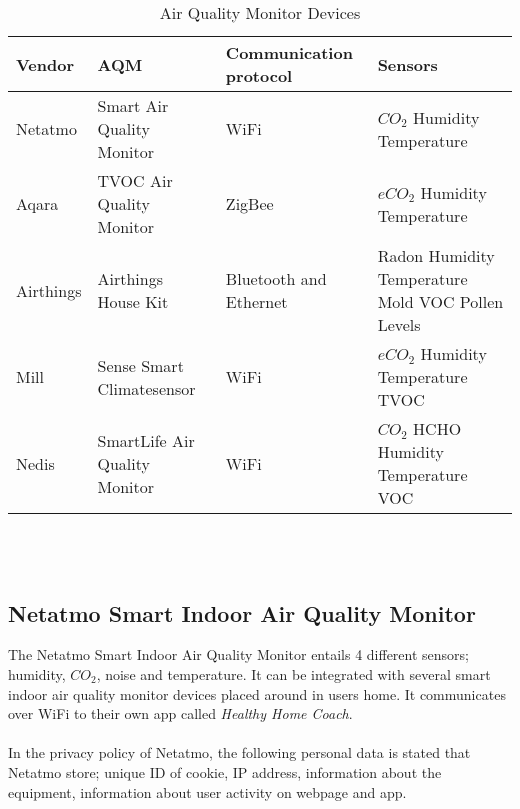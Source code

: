\begin{table}[!hbtp]
    \centering
    \begin{adjustbox}{width=1\textwidth}
    \begin{tabular}{| p{3cm} | p{5cm} | p{5cm} | p{3cm} |} 
        \hline
        \textbf{Vendor} & \textbf{AQM} & \textbf{Communication protocol} & \textbf{Sensors} \\
        \hline
        Netatmo & Smart Air Quality Monitor & WiFi & \(CO_2\) \newline Humidity \newline Temperature \\
        \hline
        Aqara & TVOC Air Quality Monitor & ZigBee & \(eCO_2\) \newline Humidity \newline Temperature \\
        \hline
        Airthings & Airthings House Kit & Bluetooth and Ethernet & Radon \newline Humidity \newline Temperature \newline Mold \newline VOC \newline Pollen Levels \\
        \hline
        Mill & Sense Smart Climatesensor & WiFi & \(eCO_2\) \newline Humidity \newline Temperature \newline TVOC \\
        \hline
        Nedis & SmartLife Air Quality Monitor & WiFi & \(CO_2\) \newline HCHO \newline Humidity \newline Temperature \newline VOC \\
        \hline
    \end{tabular}
    \end{adjustbox}
    \caption{Air Quality Monitor Devices}
    \label{tab:AQMSurvey}
\end{table}
\\\\
\FloatBarrier
\subsection{Netatmo Smart Indoor Air Quality Monitor}
The Netatmo Smart Indoor Air Quality Monitor entails 4 different sensors; humidity, \(CO_2\), noise and temperature. It can be integrated with several smart indoor air quality monitor devices placed around in users home. It communicates over WiFi to their own app called \textit{Healthy Home Coach}. 
\\\\
In the privacy policy of Netatmo, the following personal data is stated that Netatmo store; unique ID of cookie, IP address, information about the equipment, information about user activity on webpage and app. 
\\\\
